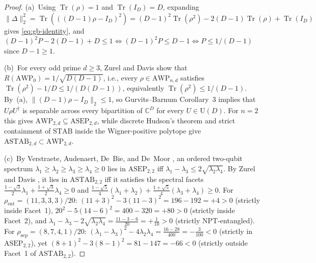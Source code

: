 \documentclass[11pt,reqno]{amsart}
\theoremstyle{definition}
\newcommand{\CC}{\mathbb{C}}
\newcommand{\Tr}{\operatorname{Tr}}
\newcommand{\STAB}{\mathrm{STAB}}
\newcommand{\ASTAB}{\mathrm{ASTAB}}
\newcommand{\AWP}{\mathrm{AWP}}
\newcommand{\ASEP}{\mathrm{ASEP}}
\begin{document}
\begin{proof}
(a)~Using $\Tr(\rho) = 1$ and $\Tr(I_D) = D$, expanding
$\|\Delta\|_2^2 = \Tr(((D-1)\rho - I_D)^2) = (D-1)^2\Tr(\rho^2) - 2(D-1)\Tr(\rho) +
\Tr(I_D)$ gives \eqref{eq:gb-identity}, and $(D-1)^2 P - 2(D-1) + D \le 1 \iff
(D-1)^2 P \le D-1 \iff P \le 1/(D-1)$ since $D - 1 \ge 1$.

(b)~For every odd prime $d \ge 3$, Zurel and Davis \cite{zurel2026astab} show that
$R(\AWP_0) = 1/\sqrt{D(D-1)}$, i.e., every $\rho \in \AWP_{n,d}$ satisfies
$\Tr(\rho^2) - 1/D \le 1/(D(D-1))$, equivalently $\Tr(\rho^2) \le 1/(D-1)$. By~(a),
$\|(D-1)\rho - I_D\|_2 \le 1$, so Gurvits--Barnum Corollary~3 \cite{gurvits2002largest}
implies that $U\rho U^\dagger$ is separable across every bipartition of $\CC^D$ for every
$U \in \mathrm{U}(D)$. For $n=2$ this gives $\AWP_{2,d} \subseteq \ASEP_{2,d}$, while
discrete Hudson's theorem \cite{gross2006hudson} and strict containment of $\STAB$ inside
the Wigner-positive polytope give $\ASTAB_{2,d} \subset \AWP_{2,d}$.

(c)~By Verstraete, Audenaert, De~Bie, and De~Moor \cite{verstraete2001maximally}, an
ordered two-qubit spectrum $\lambda_1 \ge \lambda_2 \ge \lambda_3 \ge \lambda_4 \ge 0$
lies in $\ASEP_{2,2}$ iff $\lambda_1 - \lambda_3 \le 2\sqrt{\lambda_2\lambda_4}$. By
Zurel and Davis \cite{zurel2026astab}, it lies in $\ASTAB_{2,2}$ iff it satisfies the
spectral facets $\frac{1-\sqrt{3}}{2}\lambda_1 + \frac{1+\sqrt{3}}{2}\lambda_4 \ge 0$
and $\frac{1-\sqrt{5}}{4}(\lambda_1+\lambda_2) + \frac{1+\sqrt{5}}{4}(\lambda_3+\lambda_4)
\ge 0$. For $\rho_{\mathrm{ent}} = (11, 3, 3, 3)/20$:
$(11 + 3)^2 - 3(11 - 3)^2 = 196 - 192 = +4 > 0$ (strictly inside Facet~1),
$20^2 - 5(14 - 6)^2 = 400 - 320 = +80 > 0$ (strictly inside Facet~2), and
$\lambda_1 - \lambda_3 - 2\sqrt{\lambda_2\lambda_4} = \frac{11-3-6}{20} = +\frac{1}{10}
> 0$ (strictly NPT-entangled). For $\rho_{\mathrm{sep}} = (8, 7, 4, 1)/20$:
$(\lambda_1 - \lambda_3)^2 - 4\lambda_2\lambda_4 = \frac{16 - 28}{400} = -\frac{3}{100}
< 0$ (strictly in $\ASEP_{2,2}$), yet $(8+1)^2 - 3(8-1)^2 = 81 - 147 = -66 < 0$
(strictly outside Facet~1 of $\ASTAB_{2,2}$).
\end{proof}
\end{document}
